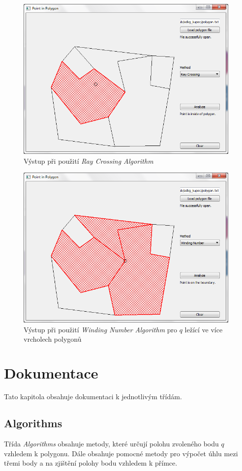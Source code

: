 \documentclass[a4paper, 12pt]{article}
\begin{document}
\begin{figure}[h!]
	\centering
	\includegraphics[width=11cm]{./pictures/gui_ray.png}
	\caption{Výstup při použití \textit{Ray Crossing Algorithm}}
\end{figure}

\begin{figure}[h!]
	\centering
	\includegraphics[width=11cm]{./pictures/gui_winding.png}
	\caption{Výstup při použití \textit{Winding Number Algorithm} pro $q$ ležící ve více vrcholech polygonů}
\end{figure}

\clearpage
 
\section{Dokumentace}
Tato kapitola obsahuje dokumentaci k jednotlivým třídám.

\subsection{Algorithms}
Třída \textsl{Algorithms} obsahuje metody, které určují polohu zvoleného bodu $q$ vzhledem k polygonu. Dále obsahuje pomocné metody pro výpočet úhlu mezi třemi body a na zjištění polohy bodu vzhledem k přímce. 
\end{document}
